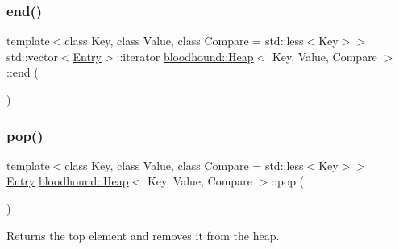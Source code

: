\mbox{\label{classbloodhound_1_1Heap_acf2ab6a5ec00cd57632c5cee032cb15d}} 
\subsubsection{\texorpdfstring{end()}{end()}}
{\footnotesize\ttfamily template$<$class Key, class Value, class Compare = std\+::less$<$\+Key$>$$>$ \\
std\+::vector$<$\hyperlink{structbloodhound_1_1Heap_1_1Entry}{Entry}$>$\+::iterator \hyperlink{classbloodhound_1_1Heap}{bloodhound\+::\+Heap}$<$ Key, Value, Compare $>$\+::end (\begin{DoxyParamCaption}{ }\end{DoxyParamCaption})\hspace{0.3cm}{\ttfamily [inline]}}

\mbox{\label{classbloodhound_1_1Heap_a8dd7cfa3a7829bafe05a407c36160574}} 
\subsubsection{\texorpdfstring{pop()}{pop()}}
{\footnotesize\ttfamily template$<$class Key, class Value, class Compare = std\+::less$<$\+Key$>$$>$ \\
\hyperlink{structbloodhound_1_1Heap_1_1Entry}{Entry} \hyperlink{classbloodhound_1_1Heap}{bloodhound\+::\+Heap}$<$ Key, Value, Compare $>$\+::pop (\begin{DoxyParamCaption}{ }\end{DoxyParamCaption})\hspace{0.3cm}{\ttfamily [inline]}}



Returns the top element and removes it from the heap. 

\mbox{\label{classbloodhound_1_1Heap_a211e187399a6b25d77a6daf309dc4dd0}} 

